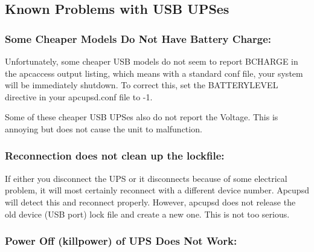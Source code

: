 {{\label{index-Troubleshooting-_0028see-problems_0029-101}
\label{index-Problems-102}

\label{Known-Problems-with-USB-UPSes}

\subsection*{Known Problems with USB UPSes}

\label{index-Problems_002c-USB-103}

\label{Some-Cheaper-Models-Do-Not-Have-Battery-Charge}

\subsubsection*{Some Cheaper Models Do Not Have Battery Charge:}

\label{index-Problems_002c-no-Battery-charge-104}
Unfortunately, some cheaper USB models do not seem to report BCHARGE in the
apcaccess output listing, which means with a standard conf file, your system
will be immediately shutdown. To correct this, set the BATTERYLEVEL directive
in your apcupsd.conf file to -1.  

Some of these cheaper USB UPSes also do not report the Voltage. This is
annoying but does not cause the unit to malfunction. 

\label{Reconnection-does-not-clean-up-the-lockfile}

\subsubsection*{Reconnection does not clean up the lockfile:}

\label{index-Problems_002c-lock-file-not-cleaned-up-105}
If either you disconnect the UPS or it disconnects because of some electrical
problem, it will most certainly reconnect with a different device number.
Apcupsd will detect this and reconnect properly. However, apcupsd does not
release the old device (USB port) lock file and create a new one. This is not
too serious. 

\label{Power-Off-_005bkillpower_005d-of-UPS-Does-Not-Work}

\subsubsection*{Power Off (killpower) of UPS Does Not Work:}

}}
